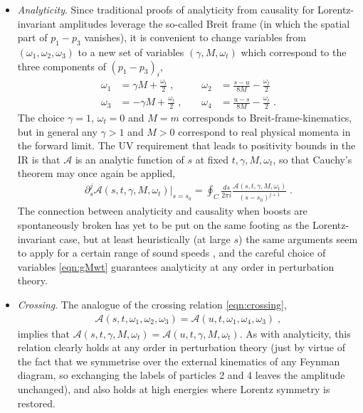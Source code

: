 \documentclass[11pt]{article}
\begin{document}
\begin{itemize}
\item \emph{Analyticity}. 
Since traditional proofs of analyticity from causality for Lorentz-invariant amplitudes leverage the so-called Breit frame (in which the spatial part of $p_1 - p_3$ vanishes), it is convenient to change variables from $(\omega_1 ,\omega_2 ,\omega_3)$ to a new set of variables $(\gamma , M , \omega_t)$ which correspond to the three components of $(p_1 - p_3)_i$, 
\begin{align}
\omega_1 &= \gamma M + \frac{\omega_t}{2} \; , \;\;\;\; &\omega_2 &= \frac{s-u}{8M} - \frac{\omega_t}{2}  \nonumber \\
\omega_3 &= -\gamma M + \frac{\omega_t}{2} \; , \;\;\;\; &\omega_4 &= \frac{u-s}{8M} - \frac{\omega_t}{2}\; . 
\label{eqn:gMwt}
\end{align}
The choice $\gamma = 1$, $\omega_t = 0$ and $M = m$ corresponds to Breit-frame-kinematics, but in general any $\gamma > 1$ and $M > 0$ correspond to real physical momenta in the forward limit.   
The UV requirement that leads to positivity bounds in the IR is that $\mathcal{A}$ is an analytic function of $s$ at fixed $t, \gamma, M , \omega_t$, so that Cauchy's theorem may once again be applied, 
\begin{align}
\partial_s^j \mathcal{A} (s, t, \gamma , M , \omega_t ) |_{s=s_0} =  \oint_C \frac{ds}{2\pi i}  \frac{ \mathcal{A} (s, t, \gamma , M , \omega_t ) }{ (s - s_0 )^{j+1} } \; . 
\end{align}
The connection between analyticity and causality when boosts are spontaneously broken has yet to be put on the same footing as the Lorentz-invariant case, but at least heuristically (at large $s$) the same arguments seem to apply for a certain range of sound speeds \cite{Grall:2021xxm}, and the careful choice of variables \eqref{eqn:gMwt} guarantees analyticity at any order in perturbation theory.  

\item \emph{Crossing}. 
The analogue of the crossing relation \eqref{eqn:crossing}, 
\begin{align}
\mathcal{A} (s, t, \omega_1, \omega_2, \omega_3 ) = \mathcal{A} (u, t, \omega_1, \omega_4, \omega_3 ) \; , 
\end{align}
implies that $\mathcal{A} (s, t , \gamma, M , \omega_t ) = \mathcal{A} (u, t , \gamma, M , \omega_t )$. 
As with analyticity, this relation clearly holds at any order in perturbation theory (just by virtue of the fact that we symmetrise over the external kinematics of any Feynman diagram, so exchanging the labels of particles 2 and 4 leaves the amplitude unchanged), and also holds at high energies where Lorentz symmetry is restored.  


\end{itemize}
\end{document}
